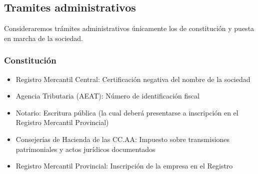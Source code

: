 \documentclass[12pt, a4paper]{book} %
\begin{document}
			\subsection{Tramites administrativos}
			Consideraremos trámites administrativos únicamente los de constitución y puesta en marcha de la sociedad.
				\subsubsection{Constitución}
				\begin{itemize}
					\item Registro Mercantil Central: Certificación negativa del nombre de la sociedad
					\item Agencia Tributaria (AEAT): Número de identificación fiscal
					\item Notario: Escritura pública (la cual deberá presentarse a inscripción en el Registro Mercantil Provincial)
					\item Consejerías de Hacienda de las CC.AA: Impuesto sobre transmisiones patrimoniales y actos jurídicos documentados
					\item Registro Mercantil Provincial: Inscripción de la empresa en el Registro  
				\end{itemize}
\end{document}
